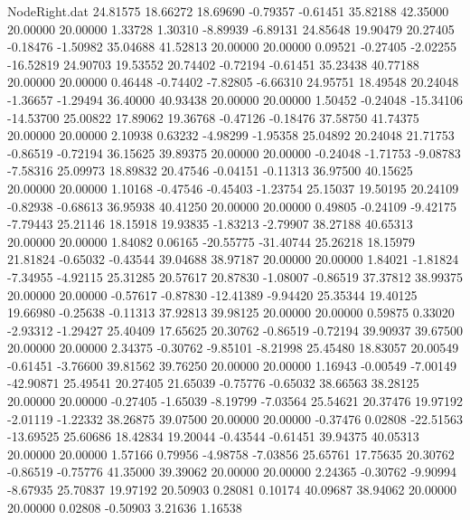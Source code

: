 \begin{filecontents}{NodeRight.dat}
  24.81575   18.66272   18.69690    -0.79357   -0.61451   35.82188   42.35000   20.00000   20.00000    1.33728    1.30310   -8.89939   -6.89131
  24.85648   19.90479   20.27405    -0.18476   -1.50982   35.04688   41.52813   20.00000   20.00000    0.09521   -0.27405   -2.02255  -16.52819
  24.90703   19.53552   20.74402    -0.72194   -0.61451   35.23438   40.77188   20.00000   20.00000    0.46448   -0.74402   -7.82805   -6.66310
  24.95751   18.49548   20.24048    -1.36657   -1.29494   36.40000   40.93438   20.00000   20.00000    1.50452   -0.24048  -15.34106  -14.53700
  25.00822   17.89062   19.36768    -0.47126   -0.18476   37.58750   41.74375   20.00000   20.00000    2.10938    0.63232   -4.98299   -1.95358
  25.04892   20.24048   21.71753    -0.86519   -0.72194   36.15625   39.89375   20.00000   20.00000   -0.24048   -1.71753   -9.08783   -7.58316
  25.09973   18.89832   20.47546    -0.04151   -0.11313   36.97500   40.15625   20.00000   20.00000    1.10168   -0.47546   -0.45403   -1.23754
  25.15037   19.50195   20.24109    -0.82938   -0.68613   36.95938   40.41250   20.00000   20.00000    0.49805   -0.24109   -9.42175   -7.79443
  25.21146   18.15918   19.93835    -1.83213   -2.79907   38.27188   40.65313   20.00000   20.00000    1.84082    0.06165  -20.55775  -31.40744
  25.26218   18.15979   21.81824    -0.65032   -0.43544   39.04688   38.97187   20.00000   20.00000    1.84021   -1.81824   -7.34955   -4.92115
  25.31285   20.57617   20.87830    -1.08007   -0.86519   37.37812   38.99375   20.00000   20.00000   -0.57617   -0.87830  -12.41389   -9.94420
  25.35344   19.40125   19.66980    -0.25638   -0.11313   37.92813   39.98125   20.00000   20.00000    0.59875    0.33020   -2.93312   -1.29427
  25.40409   17.65625   20.30762    -0.86519   -0.72194   39.90937   39.67500   20.00000   20.00000    2.34375   -0.30762   -9.85101   -8.21998
  25.45480   18.83057   20.00549    -0.61451   -3.76600   39.81562   39.76250   20.00000   20.00000    1.16943   -0.00549   -7.00149  -42.90871
  25.49541   20.27405   21.65039    -0.75776   -0.65032   38.66563   38.28125   20.00000   20.00000   -0.27405   -1.65039   -8.19799   -7.03564
  25.54621   20.37476   19.97192    -2.01119   -1.22332   38.26875   39.07500   20.00000   20.00000   -0.37476    0.02808  -22.51563  -13.69525
  25.60686   18.42834   19.20044    -0.43544   -0.61451   39.94375   40.05313   20.00000   20.00000    1.57166    0.79956   -4.98758   -7.03856
  25.65761   17.75635   20.30762    -0.86519   -0.75776   41.35000   39.39062   20.00000   20.00000    2.24365   -0.30762   -9.90994   -8.67935
  25.70837   19.97192   20.50903     0.28081    0.10174   40.09687   38.94062   20.00000   20.00000    0.02808   -0.50903    3.21636    1.16538

\end{filecontents}
